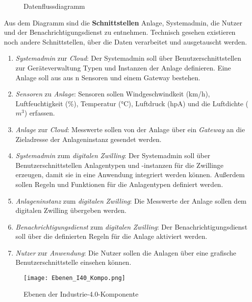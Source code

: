 \begin{figure}[ht!]
  \centering
  \noindent{}
  \caption[Datenflussdiagramm]{Datenflussdiagramm}
  \label{dataflow}
\end{figure}

\noindent Aus dem Diagramm sind die \textbf{Schnittstellen} Anlage, Systemadmin, die Nutzer und der Benachrichtigungsdienst zu entnehmen. Technisch gesehen existieren noch andere Schnittstellen, über die Daten verarbeitet und ausgetauscht werden.

\begin{enumerate}
  \item \textit{Systemadmin} zur \textit{Cloud}: Der Systemadmin soll über Benutzerschnittstellen zur Geräteverwaltung Typen und Instanzen der Anlage definieren. Eine Anlage soll aus aus n Sensoren und einem Gateway bestehen.
  \item \textit{Sensoren} zu \textit{Anlage}: Sensoren sollen Windgeschwindkeit (km/h), Luftfeuchtigkeit (\%), Temperatur (°C), Luftdruck (hpA) und die Luftdichte ($m^3$) erfassen.
  \item \textit{Anlage} zur \textit{Cloud}: Messwerte sollen von der Anlage über ein \textit{Gateway} an die Zieladresse der Anlageninstanz gesendet werden.
  \item \textit{Systemadmin} zum \textit{digitalen Zwilling}: Der Systemadmin soll über Benutzerschnittstellen Anlagentypen und -instanzen für die Zwillinge erzeugen, damit sie in eine Anwendung integriert werden können. Außerdem sollen Regeln und Funktionen für die Anlagentypen definiert werden.
  \item \textit{Anlageninstanz} zum \textit{digitalen Zwilling}: Die Messwerte der Anlage sollen dem digitalen Zwilling übergeben werden.
  \item \textit{Benachrichtigungsdienst} zum \textit{digitalen Zwilling}: Der Benachrichtigungsdienst soll über die definierten Regeln für die Anlage aktiviert werden.
  \item \textit{Nutzer} zur \textit{Anwendung}: Die Nutzer sollen die Anlagen über eine grafische Benutzerschnittstelle einsehen können.
\end{enumerate}


\begin{figure}[h]
  \centering
  \texttt{[image: Ebenen\_I40\_Kompo.png]}
  \caption[Ebenen der Industrie-4.0-Komponente]{Ebenen der Industrie-4.0-Komponente \citep[S. 52]{BITKOM2015}}
  \label{ebenen_i40}
\end{figure}


